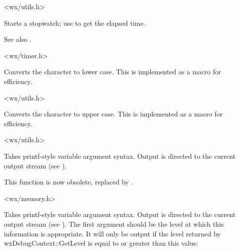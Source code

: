 <wx/utils.h>

\label{wxstarttimer}


Starts a stopwatch; use  to get the elapsed time.

See also .


<wx/timer.h>

\label{wxtolower}


Converts the character to lower case. This is implemented as a macro for efficiency.


<wx/utils.h>

\label{wxtoupper}


Converts the character to upper case. This is implemented as a macro for efficiency.


<wx/utils.h>

\label{wxtrace}


Takes printf-style variable argument syntax. Output
is directed to the current output stream (see ).

This function is now obsolete, replaced by .


<wx/memory.h>

\label{wxtracelevel}


Takes printf-style variable argument syntax. Output
is directed to the current output stream (see ).
The first argument should be the level at which this information is appropriate.
It will only be output if the level returned by wxDebugContext::GetLevel is equal to or greater than
this value.

